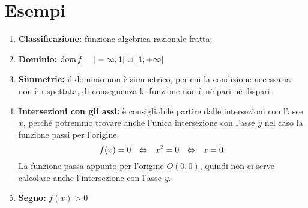\section{Esempi}
    \begin{ex}[Studiare la funzione $ y=\frac{x^2}{x-1}$.]
        \begin{enumerate}
            \item \textbf{Classificazione:} funzione algebrica razionale fratta;
            \item \textbf{Dominio:} $\operatorname{dom} f=\;]-\infty;1[\ \cup \ ]1;+\infty[$ 
            \item \textbf{Simmetrie:} il dominio non è simmetrico, per cui la condizione necessaria non è rispettata, di conseguenza la funzione non è né pari né dispari.
            \item \textbf{Intersezioni con gli assi:} è consigliabile partire dalle intersezioni con l'asse $x$, perchè potremmo trovare anche l'unica intersezione con l'asse $y$ nel caso la funzione passi per l'origine.
            \[f(x)=0\ \ \Harr \ \ x^2=0\ \ \Harr \ \ x=0.\]
            La funzione passa appunto per l'origine $O(0,0)$, quindi non ci serve calcolare anche l'intersezione con l'asse $y$.
            \item \textbf{Segno:} $f(x)>0$
            \begin{center}
\end{center}
\end{enumerate}
\end{ex}
